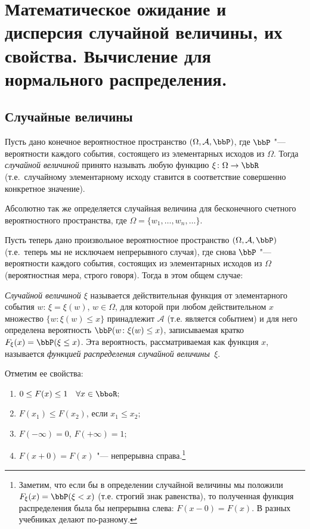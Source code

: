 \chapter{Математическое ожидание и дисперсия случайной величины, их свойства. Вычисление для нормального распределения.}
\section{Случайные величины}

Пусть дано конечное вероятностное пространство $(\Omega,\mathcal A, \bbP)$, где $\bbP$ "--- вероятности каждого события, состоящего из элементарных исходов из $\Omega$. Тогда \textit{случайной величиной} принято называть любую функцию $\xi\colon \Omega \to \bbR$ (т.е.~случайному элементарному исходу ставится в соответствие совершенно конкретное значение).

Абсолютно так же определяется случайная величина для бесконечного счетного вероятностного пространства, где $\Omega = \{w_1,\dots, w_n,\dots\}$.

Пусть теперь дано произвольное вероятностное пространство $(\Omega,\mathcal A, \bbP)$ (т.е.~теперь мы не исключаем непрерывного случая), где снова $\bbP$ "--- вероятности каждого события, состоящих из элементарных исходов из $\Omega$ (вероятностная мера, строго говоря). Тогда в этом общем случае:
\begin{defn}
\textit{Случайной величиной $\xi$} называется действительная функция от элементарного события $w$: $\xi = \xi(w)$, $w\in\Omega$, для которой при любом действительном $x$ множество $\{w\colon \xi(w) \le x\}$ принадлежит $\mathcal A$ (т.е. является событием) и для него определена вероятность $\bbP(w\colon \xi(w) \le x)$, записываемая кратко $F_\xi(x)=\bbP(\xi \le x)$. Эта вероятность, рассматриваемая как функция $x$, называется \textit{функцией распределения случайной величины~$\xi$}.
\end{defn}
Отметим ее свойства:
\begin{enumerate}
\item 
$0 \le F(x) \le 1\quad \forall x \in \bboR;$ 
\item
$F(x_1) \le F(x_2)$, если $x_1\le x_2;$
\item
$F(-\infty)=0$, $F(+\infty)=1;$
\item
$F(x+0)=F(x)$ "--- непрерывна справа.\footnote{Заметим, что если бы в определении случайной величины мы положили $F_\xi(x)=\bbP(\xi < x)$ (т.е. строгий знак равенства), то полученная функция распределения была бы непрерывна слева: $F(x-0)=F(x)$. В разных учебниках делают по-разному.}
\end{enumerate}

